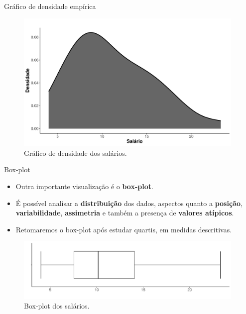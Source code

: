 \documentclass[
  ignorenonframetext,
  serif,
  professionalfont,
  usenames,
  dvipsnames,
  aspectratio = 169]{beamer}
\begin{document}
\begin{frame}{Gráfico de densidade empírica}
\label{gruxe1fico-de-densidade-empuxedrica-1}
\begin{figure}

{\centering \includegraphics[width=11cm]{encontro1_files/figure-beamer/unnamed-chunk-52-1} 

}

\caption{Gráfico de densidade dos salários.}\label{fig:unnamed-chunk-52}
\end{figure}
\end{frame}

\begin{frame}{Box-plot}
\label{box-plot}
\begin{itemize}
\item
  Outra importante visualização é o \textbf{box-plot}.
\item
  É possível analisar a \textbf{distribuição} dos dados, aspectos quanto
  a \textbf{posição}, \textbf{variabilidade}, \textbf{assimetria} e
  também a presença de \textbf{valores atípicos}.
\item
  Retomaremos o box-plot após estudar quartis, em medidas descritivas.
\end{itemize}

\begin{figure}

{\centering \includegraphics[width=11cm]{encontro1_files/figure-beamer/unnamed-chunk-53-1} 

}

\caption{Box-plot dos salários.}\label{fig:unnamed-chunk-53}
\end{figure}
\end{frame}
\end{document}
